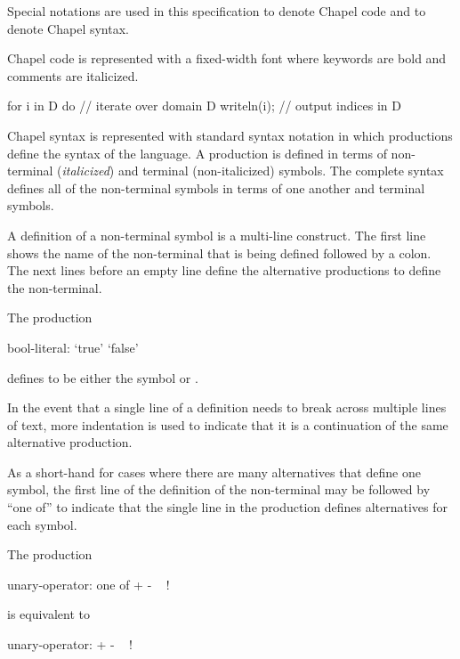 \label{Notation}

Special notations are used in this specification to denote Chapel code
and to denote Chapel syntax.

Chapel code is represented with a fixed-width font where keywords are
bold and comments are italicized.
\begin{example}
\begin{chapel}
for i in D do   // iterate over domain D
  writeln(i);   // output indices in D
\end{chapel}
\end{example}

Chapel syntax is represented with standard syntax notation in which
productions define the syntax of the language.  A production is
defined in terms of non-terminal ({\it italicized}) and terminal
(non-italicized) symbols.  The complete syntax defines all of the
non-terminal symbols in terms of one another and terminal symbols.

A definition of a non-terminal symbol is a multi-line construct.  The
first line shows the name of the non-terminal that is being defined
followed by a colon.  The next lines before an empty line define the
alternative productions to define the non-terminal.
\begin{example}
The production
\begin{syntax_donotcollect}
bool-literal:
  `true'
  `false'
\end{syntax_donotcollect}
defines  to be either the symbol  or
.
\end{example}
In the event that a single line of a definition needs to break across
multiple lines of text, more indentation is used to indicate that it
is a continuation of the same alternative production.

As a short-hand for cases where there are many alternatives that
define one symbol, the first line of the definition of the
non-terminal may be followed by ``one of'' to indicate that the single
line in the production defines alternatives for each symbol.
\begin{example}
The production
\begin{syntax_donotcollect}
unary-operator: one of
  + - ~ !
\end{syntax_donotcollect}
is equivalent to
\begin{syntax_donotcollect}
unary-operator:
  +
  -
  ~
  !
\end{syntax_donotcollect}
\end{example}

